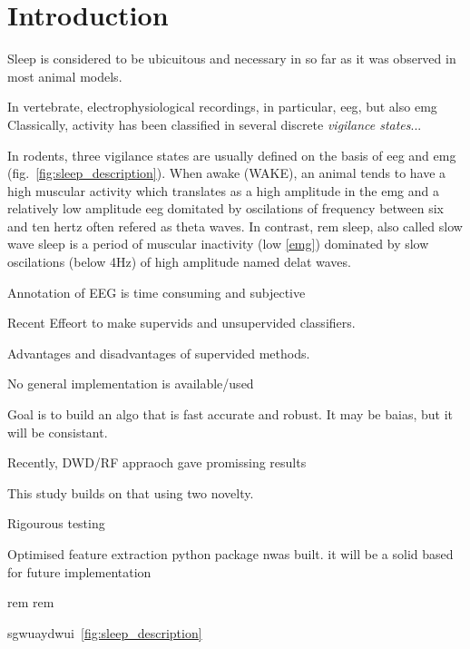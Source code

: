 \section{Introduction} \label{intro}

Sleep is considered to be ubicuitous and necessary in so far as it was observed in most animal models.

In vertebrate, electrophysiological recordings, in particular, \gls{eeg}, but also \gls{emg}
Classically, activity has been classified in several discrete \emph{vigilance states}...

In rodents, three vigilance states are usually defined on the basis of \gls{eeg} and \gls{emg} (fig.~\ref{fig:sleep_description}).
When awake (WAKE), an animal tends to have a high muscular activity which translates as a high amplitude in the \gls{emg} and a relatively low amplitude
\gls{eeg} domitated by oscilations of frequency between six and ten hertz often refered as theta waves.
In contrast, \gls{rem} sleep, also called slow wave sleep is a period of muscular inactivity (low \ref{emg}) dominated by slow oscilations (below 4Hz) of high amplitude named delat waves.



Annotation of EEG is time consuming and subjective

Recent Effeort to make supervids and unsupervided classifiers.

Advantages and disadvantages of supervided methods.

No general implementation is available/used

Goal is to build an algo that is fast accurate and robust.
It may be baias, but it will be consistant.

Recently, DWD/RF appraoch gave promissing results


This study builds on that using two novelty.

Rigourous testing

Optimised feature extraction python package nwas built. it will be a solid based for future implementation

\Gls{rem}
\Gls{rem}


sgwuaydwui~\ref{fig:sleep_description}

